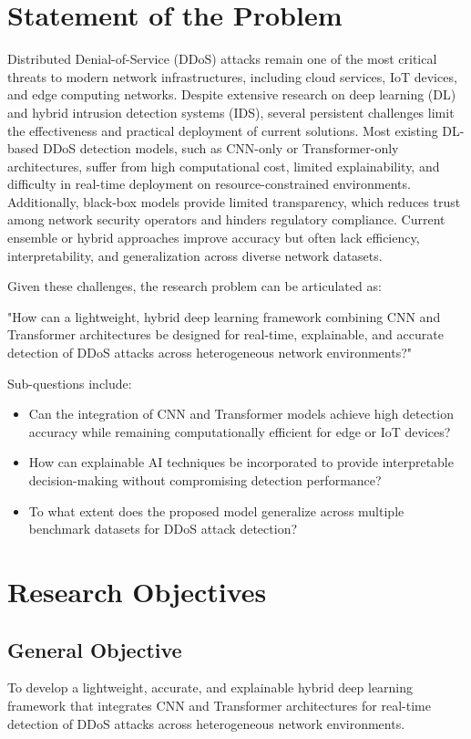 \documentclass[12pt, a4paper]{report}
\begin{document}
\chapter{Statement of the Problem}
Distributed Denial-of-Service (DDoS) attacks remain one of the most critical threats to modern network infrastructures, including cloud services, IoT devices, and edge computing networks. Despite extensive research on deep learning (DL) and hybrid intrusion detection systems (IDS), several persistent challenges limit the effectiveness and practical deployment of current solutions. Most existing DL-based DDoS detection models, such as CNN-only or Transformer-only architectures, suffer from high computational cost, limited explainability, and difficulty in real-time deployment on resource-constrained environments. Additionally, black-box models provide limited transparency, which reduces trust among network security operators and hinders regulatory compliance. Current ensemble or hybrid approaches improve accuracy but often lack efficiency, interpretability, and generalization across diverse network datasets.

Given these challenges, the research problem can be articulated as:

"How can a lightweight, hybrid deep learning framework combining CNN and Transformer architectures be designed for real-time, explainable, and accurate detection of DDoS attacks across heterogeneous network environments?"

Sub-questions include:
\begin{itemize}
    

\item Can the integration of CNN and Transformer models achieve high detection accuracy while remaining computationally efficient for edge or IoT devices?

\item How can explainable AI techniques be incorporated to provide interpretable decision-making without compromising detection performance?

\item To what extent does the proposed model generalize across multiple benchmark datasets for DDoS attack detection?
\end{itemize}
\chapter{Research Objectives}
\section{General Objective}
To develop a lightweight, accurate, and explainable hybrid deep learning framework that integrates CNN and Transformer architectures for real-time detection of DDoS attacks across heterogeneous network environments.
\end{document}

